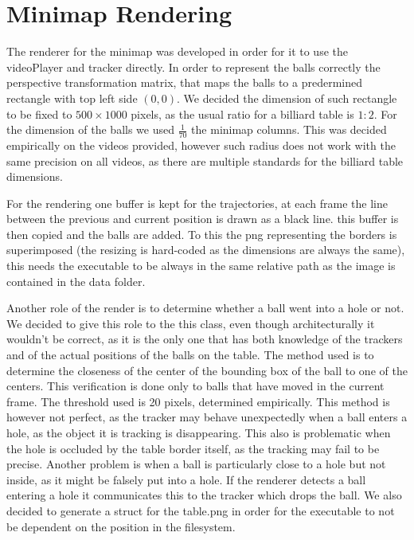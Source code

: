 \section{Minimap Rendering}

The renderer for the minimap was developed in order for it to use the videoPlayer and 
tracker directly. In order to represent the balls correctly the perspective transformation
matrix, that maps the balls to a predermined rectangle with top left side $(0,0)$. We decided
the dimension of such rectangle to be fixed to $500 \times 1000$ pixels, as the usual ratio
for a billiard table is $1:2$. For the dimension of the balls we used $\frac{1}{70}$ the minimap
columns. This was decided empirically on the videos provided, however such radius does not work
with the same precision on all videos, as there are multiple standards for the billiard table 
dimensions.\par 
For the rendering one buffer is kept for the trajectories, at each frame the line between the
previous and current position is drawn as a black line. this buffer is then copied and the
balls are added. To this the png representing the borders is superimposed (the resizing is hard-coded
as the dimensions are always the same), this needs the executable to be always in the same relative
path as the image is contained in the data folder.\par 
Another role of the render is to determine whether a ball went into a hole or not. We decided to
give this role to the this class, even though architecturally it wouldn't be correct, as it is the 
only one that has both knowledge of the trackers and of the actual positions of the balls on the table.
The method used is to determine the closeness of the center of the bounding box of the ball to one 
of the centers. This verification is done only to balls that have moved in the current frame. The
threshold used is 20 pixels, determined empirically. This method is however not perfect, as the 
tracker may behave unexpectedly when a ball enters a hole, as the object it is tracking is disappearing.
This also is problematic when the hole is occluded by the table border itself, as the tracking may fail
to be precise. Another problem is when a ball is particularly close to a hole but not inside, as it
might be falsely put into a hole. If the renderer detects a ball entering a hole it communicates
this to the tracker which drops the ball.
We also decided to generate a struct for the table.png in order for the executable to not be dependent on the position in the filesystem.

